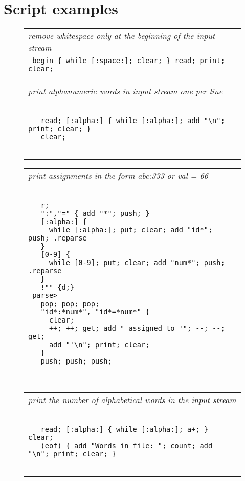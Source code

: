 \documentclass[a4paper,12pt]{article}
\begin{document}
\section{Script examples}
 \begin{figure}
 \begin{tabular}{ l }
 \emph{ remove whitespace only at the beginning of the input stream } \\ 
 \verb| begin { while [:space:]; clear; } read; print; clear; |
 \end{tabular} 
 \end{figure}
 \begin{figure}
 \begin{tabular}{ l }
 \emph{ print alphanumeric words in input stream one per line } \\ 
 \begin{lstlisting}[breaklines] 

   read; [:alpha:] { while [:alpha:]; add "\n"; print; clear; }
   clear;
 
 \end{lstlisting} 
 \end{tabular} 

 \end{figure}
 \begin{figure}
 \begin{tabular}{ l }
 \emph{ print assignments in the form abc:333 or val = 66 } \\ 
 \begin{lstlisting}[breaklines] 

   r; 
   ":","=" { add "*"; push; }
   [:alpha:] { 
     while [:alpha:]; put; clear; add "id*"; push; .reparse 
   }
   [0-9] {
     while [0-9]; put; clear; add "num*"; push; .reparse
   }
   !"" {d;}
 parse>
   pop; pop; pop;
   "id*:*num*", "id*=*num*" {
     clear;
     ++; ++; get; add " assigned to '"; --; --; get;
     add "'\n"; print; clear;
   }
   push; push; push;
 
 \end{lstlisting} 
 \end{tabular} 

 \end{figure}
 \begin{figure}
 \begin{tabular}{ l }
 \emph{ print the number of alphabetical words in the input stream } \\ 
 \begin{lstlisting}[breaklines] 

   read; [:alpha:] { while [:alpha:]; a+; } clear;
   (eof) { add "Words in file: "; count; add "\n"; print; clear; }
 
 \end{lstlisting} 
 \end{tabular} 

 \end{figure}
\end{document}
